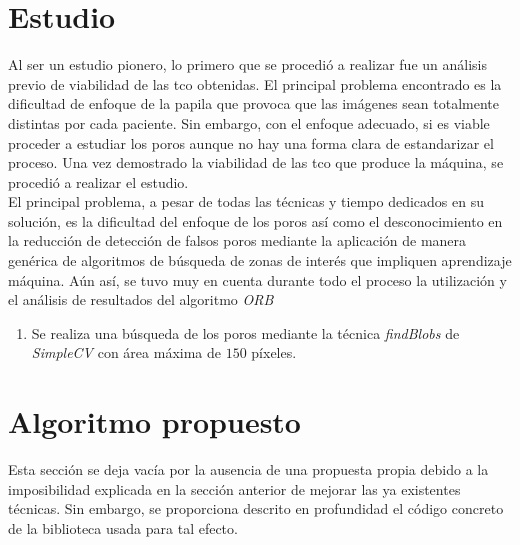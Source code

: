 \section{Estudio}
Al ser un estudio pionero, lo primero que se procedió a realizar fue
un análisis previo de viabilidad de las \gls{tco} obtenidas. El
principal problema encontrado es la dificultad de enfoque de la papila
que provoca que las imágenes sean totalmente distintas por cada
paciente. Sin embargo, con el enfoque adecuado, si es viable proceder
a estudiar los poros aunque no hay una forma clara de estandarizar el
proceso. Una vez demostrado la viabilidad de las \gls{tco} que produce
la máquina, se procedió a realizar el estudio.\\
El principal problema, a pesar de todas las técnicas y tiempo
dedicados en su solución, es la dificultad del enfoque de los poros
así como el desconocimiento en la reducción de detección de falsos
poros mediante la aplicación de manera genérica de algoritmos de
búsqueda de zonas de interés que impliquen
aprendizaje máquina. Aún así, se tuvo muy en cuenta durante todo el
proceso la utilización y el análisis de resultados del algoritmo
\emph{\gls{ORB}~\citep*{orb-bib}}
\begin{enumerate}
\item Se realiza una búsqueda de los poros mediante la técnica
  \emph{findBlobs} de \emph{SimpleCV} con área máxima de $150$
  píxeles.
\end{enumerate}

\section{Algoritmo propuesto}
Esta sección se deja vacía por la ausencia de una propuesta propia
debido a la imposibilidad explicada en la sección anterior de mejorar
las ya existentes técnicas. Sin embargo, se proporciona descrito en
profundidad el código concreto de la biblioteca usada para tal efecto.
